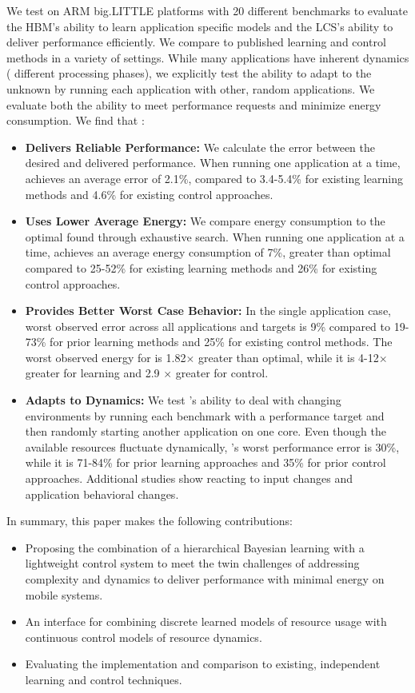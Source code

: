 We test \SYSTEM{} on ARM big.LITTLE platforms with 20 different
benchmarks to evaluate the HBM's ability to learn application specific
models and the LCS's ability to deliver performance efficiently.  We
compare to published learning and control methods in a variety of
settings.  While many applications have inherent dynamics (\ie
different processing phases), we explicitly test the ability to adapt
to the unknown by running each application with other, random
applications.  We evaluate both the ability to meet performance
requests and minimize energy consumption.  We find that \SYSTEM{}:
\begin{itemize}
\item \textbf{Delivers Reliable Performance: } We calculate the error
  between the desired and delivered performance.  When running one
  application at a time, \SYSTEM{} achieves an average error of 2.1\%,
  compared to 3.4-5.4\% for existing learning methods and 4.6\% for
  existing control approaches.
\item \textbf{Uses Lower Average Energy:} We compare energy
  consumption to the optimal found through exhaustive search.  When
  running one application at a time, \SYSTEM{} achieves an average
  energy consumption of 7\%, greater than optimal compared to 25-52\%
  for existing learning methods and 26\% for existing control
  approaches.
\item \textbf{Provides Better Worst Case Behavior:} In the single
  application case, \SYSTEM{} worst observed error across all
  applications and targets is 9\% compared to 19-73\% for prior
  learning methods and 25\% for existing control methods.  The worst
  observed energy for \SYSTEM{} is 1.82$\times$ greater than optimal,
  while it is 4-12$\times$ greater for learning and 2.9 $\times$
  greater for control.
\item \textbf{Adapts to Dynamics:} We test \SYSTEM{}'s ability to deal
  with changing environments by running each benchmark with a
  performance target and then randomly starting another application on
  one core.  Even though the available resources fluctuate
  dynamically, \SYSTEM{}'s worst performance error is 30\%, while it
  is 71-84\% for prior learning approaches and 35\% for prior control
  approaches.  Additional studies show \SYSTEM{} reacting to input
  changes and application behavioral changes.
\end{itemize}
In summary, this paper makes the following contributions:
\begin{itemize}
\item Proposing the combination of a hierarchical Bayesian learning
  with a lightweight control system to meet the twin challenges of
  addressing complexity and dynamics to deliver performance with
  minimal energy on mobile systems.
\item An interface for combining discrete learned models of resource
  usage with continuous control models of resource dynamics.
\item Evaluating the implementation and comparison to existing,
  independent learning and control techniques.
\end{itemize}


